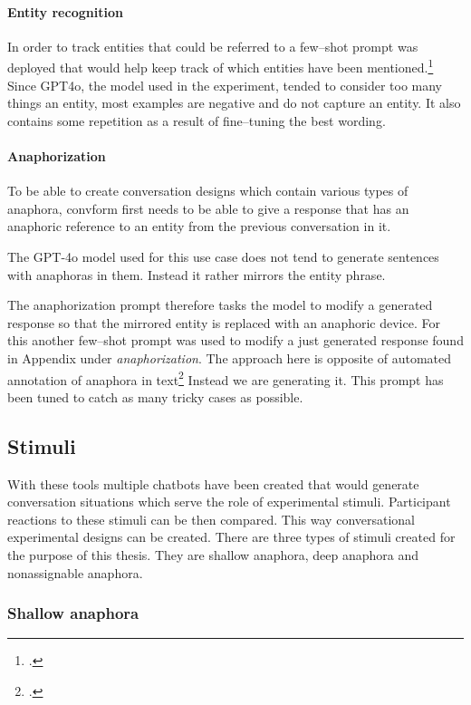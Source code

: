 \documentclass[12pt]{report}
\begin{document}
{\paragraph{Entity recognition}

In order to track entities that could be referred to
a few–shot prompt was deployed that would help
keep track of which entities have been mentioned.\footcite{Loiciga2022NewOO}
Since GPT4o, the model used in the experiment,
tended to consider too many things an entity,
most examples are negative and do not capture an entity.
It also contains some repetition as a result of fine–tuning the best wording.

\paragraph{Anaphorization}

To be able to create conversation designs which contain various types of anaphora,
convform first needs to be able to give a response that
has an anaphoric reference to an entity from the previous conversation in it.

The GPT-4o model used for this use case
does not tend to generate sentences with anaphoras in them.
Instead it rather mirrors the entity phrase.

The anaphorization prompt therefore tasks the model
to modify a generated response so
that the mirrored entity is replaced with
an anaphoric device.
For this another few–shot prompt was used to modify a just generated response
found in Appendix under \textit{anaphorization}.
The approach here is opposite of automated annotation of anaphora in text\footcite{loaiciga-etal-2022-anaphoric}
Instead we are generating it.
This prompt has been tuned to catch as many tricky cases as possible.

\subsection{Stimuli}

With these tools
multiple chatbots have been created
that would generate conversation situations
which serve the role of experimental stimuli.
Participant reactions to these stimuli
can be then compared.
This way conversational experimental designs can be created.
There are three types of stimuli created
for the purpose of this thesis.
They are shallow anaphora, deep anaphora and nonassignable anaphora.

\subsubsection{Shallow anaphora}

}
\end{document}
